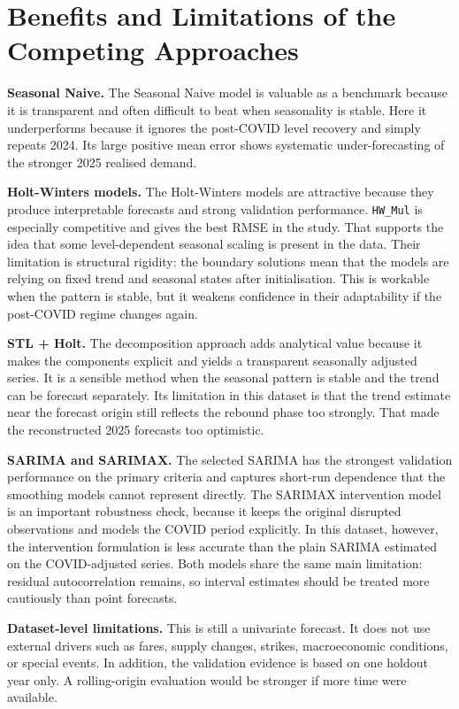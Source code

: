 \documentclass[runningheads]{llncs}
\begin{document}
\section{Benefits and Limitations of the Competing Approaches}
\textbf{Seasonal Naive.} The Seasonal Naive model is valuable as a benchmark because it is transparent and often difficult to beat when seasonality is stable. Here it underperforms because it ignores the post-COVID level recovery and simply repeats 2024. Its large positive mean error shows systematic under-forecasting of the stronger 2025 realised demand.

\textbf{Holt-Winters models.} The Holt-Winters models are attractive because they produce interpretable forecasts and strong validation performance. \texttt{HW\_Mul} is especially competitive and gives the best RMSE in the study. That supports the idea that some level-dependent seasonal scaling is present in the data. Their limitation is structural rigidity: the boundary solutions mean that the models are relying on fixed trend and seasonal states after initialisation. This is workable when the pattern is stable, but it weakens confidence in their adaptability if the post-COVID regime changes again.

\textbf{STL + Holt.} The decomposition approach adds analytical value because it makes the components explicit and yields a transparent seasonally adjusted series. It is a sensible method when the seasonal pattern is stable and the trend can be forecast separately. Its limitation in this dataset is that the trend estimate near the forecast origin still reflects the rebound phase too strongly. That made the reconstructed 2025 forecasts too optimistic.

\textbf{SARIMA and SARIMAX.} The selected SARIMA has the strongest validation performance on the primary criteria and captures short-run dependence that the smoothing models cannot represent directly. The SARIMAX intervention model is an important robustness check, because it keeps the original disrupted observations and models the COVID period explicitly. In this dataset, however, the intervention formulation is less accurate than the plain SARIMA estimated on the COVID-adjusted series. Both models share the same main limitation: residual autocorrelation remains, so interval estimates should be treated more cautiously than point forecasts.

\textbf{Dataset-level limitations.} This is still a univariate forecast. It does not use external drivers such as fares, supply changes, strikes, macroeconomic conditions, or special events. In addition, the validation evidence is based on one holdout year only. A rolling-origin evaluation would be stronger if more time were available.
\end{document}
